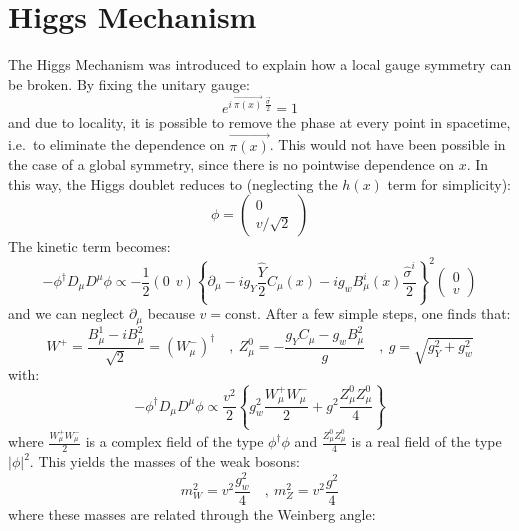 \documentclass[11pt,a4paper,twoside,openright]{report}
\begin{document}
\section{Higgs Mechanism}
The Higgs Mechanism was introduced to explain how a local gauge symmetry can be broken. By fixing the unitary gauge:
\begin{equation}
e^{i\ \overrightarrow{\pi (x)}\ \frac{\overrightarrow{\sigma}}{2}} =1
\end{equation}
and due to locality, it is possible to remove the phase at every point in spacetime, i.e.\ to eliminate the dependence on \(\overrightarrow{\pi(x)}\). This would not have been possible in the case of a global symmetry, since there is no pointwise dependence on \(x\). In this way, the Higgs doublet reduces to (neglecting the \(h(x)\) term for simplicity):
\begin{equation}
\phi = \begin{pmatrix} 0 \\ v/\sqrt{2} \end{pmatrix}
\end{equation}
The kinetic term becomes:
\begin{equation}
-\phi^\dagger D_\mu D^\mu \phi \propto -\frac{1}{2} (0\ \ v) \left\{ \partial_\mu - ig_Y\frac{\hat{Y}}{2}C_\mu(x)-ig_wB^i_\mu(x)\frac{\hat{\sigma}^i}{2} \right\}^2 \begin{pmatrix} 0 \\ v \end{pmatrix}
\end{equation}
and we can neglect \(\partial_\mu\) because \(v=\mathrm{const}\). After a few simple steps, one finds that:
\begin{equation}
W^+=\frac{B^1_\mu-iB^2_\mu}{\sqrt{2}}=\left( W^-_\mu \right)^\dagger \quad, \ Z^0_\mu=- \frac{g_YC_\mu-g_wB^2_\mu}{g} \quad, \ g=\sqrt{g_Y^2+g_w^2}
\end{equation}
with:
\begin{equation}
-\phi^\dagger D_\mu D^\mu \phi \propto\frac{v^2}{2} \left\{ g_w^2 \frac{W_\mu^+W_\mu^-}{2} + g^2\frac{Z^0_\mu Z^0_\mu}{4} \right\}
\end{equation}
where \(\frac{W_\mu^+W_\mu^-}{2}\) is a complex field of the type \(\phi^\dagger \phi\) and \(\frac{Z^0_\mu Z^0_\mu}{4}\) is a real field of the type \(|\phi|^2\). This yields the masses of the weak bosons:
\begin{equation}
m_W^2=v^2\frac{g_w^2}{4} \quad, \ m_Z^2=v^2\frac{g^2}{4}
\end{equation}
where these masses are related through the Weinberg angle:
\end{document}
